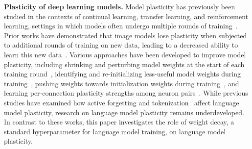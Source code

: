 \textbf{Plasticity of deep learning models.}
Model plasticity has previously been studied in the contexts of continual learning, transfer learning, and reinforcement learning, settings in which models often undergo multiple rounds of training~\citep{dohare2024loss, klein2024plasticity,coetzer2025restoring}.
Prior works have demonstrated that image models lose plasticity when subjected to additional rounds of training on new data, leading to a decreased ability to learn this new data~\citep{dohare2024loss,lyle2023understanding,klein2024plasticity}.
Various approaches have been developed to improve model plasticity, including shrinking and perturbing model weights at the start of each training round~\citep{ash2020shrinkandperturb}, identifying and re-initializing less-useful model weights during training~\citep{dohare2024loss}, pushing weights towards initialization weights during training~\citep{kumar2023maintaining}, and learning per-connection plasticity strengths among neuron pairs~\citep{miconi2018differentiable}.
While previous studies have examined how active forgetting and tokenization~\citep{chen2023improving,abagyan2025onetokenizer} affect language model plasticity, research on language model plasticity remains underdeveloped. In contrast to these works, this paper investigates the role of weight decay, a standard hyperparameter for language model training, on language model plasticity.


